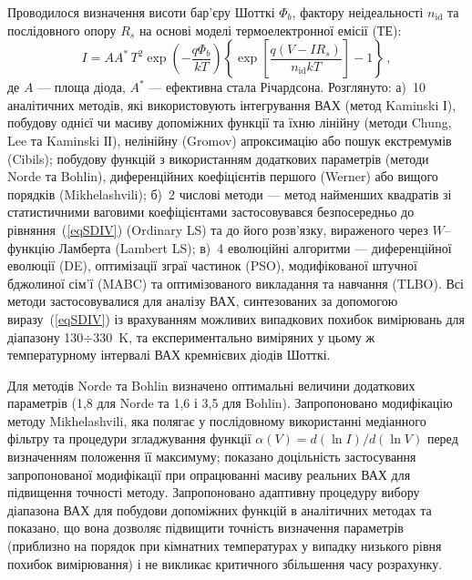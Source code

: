 Проводилося визначення висоти бар'єру Шотткі $\Phi_b$, фактору неідеальності $n_\mathrm{id}$ та послідовного опору $R_s$ на основі
моделі термоелектронної емісії (ТЕ):
\begin{equation}\label{eqSDIV}
I=AA^*\,T^2\exp\left(-\frac{q\Phi_b}{kT}\right)\left\{\exp\left[\frac{q(V-IR_s)}{n_\mathrm{id}kT}\right]-1\right\}\,,
\end{equation}
де
$A$ --- площа діода,
$A^*$ --- ефективна стала Річардсона.
Розглянуто:
а)~10 аналітичних методів, які використовують інтегрування ВАХ (метод Kaminski І),
побудову однієї чи масиву допоміжних функції та їхню лінійну (методи Chung, Lee та Kaminski ІІ),
нелінійну (Gromov) апроксимацію або пошук екстремумів (Cibils);
побудову функцій з використанням додаткових параметрів (методи Norde та Bohlin),
диференційних коефіцієнтів першого (Werner) або вищого порядків (Mikhelashvili);
б)~2 числові методи --- метод найменших квадратів зі статистичними ваговими коефіцієнтами
застосовувався безпосередньо до рівняння~(\ref{eqSDIV}) (Ordinary LS) та до
його розв'язку, вираженого через $W$--функцію Ламберта (Lambert LS);
в)~4 еволюційні алгоритми --- диференційної еволюції (DE),
оптимізації зграї частинок (PSO),
модифікованої штучної бджолиної сім'ї (MABC) та
оптимізованого викладання та навчання (TLBO).
Всі методи застосовувалися для аналізу
ВАХ,  синтезованих за допомогою виразу~(\ref{eqSDIV}) із врахуванням можливих випадкових похибок вимірювань
для діапазону 130$\div$330~K,
та експериментально виміряних у цьому ж температурному інтервалі ВАХ кремнієвих діодів Шотткі.

Для методів Norde та Bohlin визначено  оптимальні величини додаткових параметрів (1,8 для Norde та 1,6 і 3,5 для Bohlin).
Запропоновано модифікацію методу Mikhelashvili, яка
полягає у послідовному використанні медіанного фільтру та процедури згладжування функції $\alpha(V)=d(\ln I)/d(\ln V)$
перед визначенням положення її максимуму;
показано доцільність застосування запропонованої модифікації при опрацюванні масиву реальних ВАХ для
підвищення точності методу.
Запропоновано адаптивну процедуру вибору діапазона ВАХ для побудови допоміжних функцій в
аналітичних методах та показано, що вона дозволяє підвищити точність визначення параметрів
(приблизно на порядок при кімнатних температурах у випадку низького рівня похибок вимірювання)
і не викликає критичного збільшення часу розрахунку.



